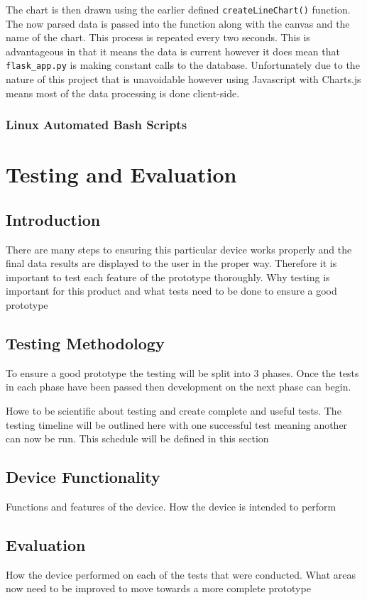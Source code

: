 \documentclass[10pt,a4paper]{article}
\begin{document}
The chart is then drawn using the earlier defined \texttt{createLineChart()} function. The now parsed data is passed into the function along with the canvas and the name of the chart. This process is repeated every two seconds. This is advantageous in that it means the data is current however it does mean that \texttt{flask\_app.py} is making constant calls to the database. Unfortunately due to the nature of this project that is unavoidable however using Javascript with Charts.js means most of the data processing is done client-side. 

\subsubsection{Linux Automated Bash Scripts}


\section{Testing and Evaluation}
\subsection{Introduction}
There are many steps to ensuring this particular device works properly and the final data results are displayed to the user in the proper way. Therefore it is important to test each feature of the prototype thoroughly.  
Why testing is important for this product and what tests need to be done to ensure a good prototype
\subsection{Testing Methodology}
To ensure a good prototype the testing will be split into 3 phases. Once the tests in each phase have been passed then development on the next phase can begin.

Howe to be scientific about testing and create complete and useful tests. The testing timeline will be outlined here with one successful test meaning another can now be run. This schedule will be defined in this section
\subsection{Device Functionality}
Functions and features of the device. How the device is intended to perform
\subsection{Evaluation}
How the device performed on each of the tests that were conducted. What areas now need to be improved to move towards a more complete prototype
\end{document}
